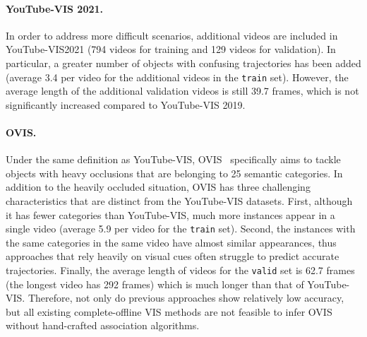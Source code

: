 \documentclass{article}
\begin{document}
\paragraph{YouTube-VIS 2021.}
In order to address more difficult scenarios, additional videos are included in YouTube-VIS2021 (794 videos for training and 129 videos for validation).
In particular, a greater number of objects with confusing trajectories has been added (average 3.4 per video for the additional videos in the \texttt{train} set).
However, the average length of the additional validation videos is still 39.7 frames, which is not significantly increased compared to YouTube-VIS 2019.

\paragraph{OVIS.}
Under the same definition as YouTube-VIS, OVIS~\cite{OVIS-Dataset} specifically aims to tackle objects with heavy occlusions that are belonging to 25 semantic categories.
In addition to the heavily occluded situation, OVIS has three challenging characteristics that are distinct from the YouTube-VIS datasets.
First, although it has fewer categories than YouTube-VIS, much more instances appear in a single video (average 5.9 per video for the \texttt{train} set).
Second, the instances with the same categories in the same video have almost similar appearances, thus approaches that rely heavily on visual cues often struggle to predict accurate trajectories.
Finally, the average length of videos for the \texttt{valid} set is 62.7 frames (the longest video has 292 frames) which is much longer than that of YouTube-VIS.
Therefore, not only do previous approaches show relatively low accuracy, but all existing complete-offline VIS methods are not feasible to infer OVIS without hand-crafted association algorithms.
\end{document}
